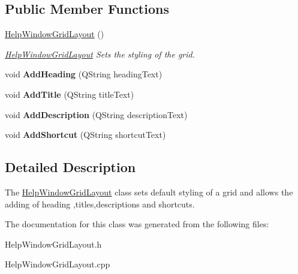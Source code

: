 \subsection*{Public Member Functions}
\begin{DoxyCompactItemize}
\item 
\hypertarget{class_help_window_grid_layout_abe267213e1b3e751df8ef27a715e7e19}{}\hyperlink{class_help_window_grid_layout_abe267213e1b3e751df8ef27a715e7e19}{Help\+Window\+Grid\+Layout} ()\label{class_help_window_grid_layout_abe267213e1b3e751df8ef27a715e7e19}

\begin{DoxyCompactList}\small\item\em \hyperlink{class_help_window_grid_layout}{Help\+Window\+Grid\+Layout} Sets the styling of the grid. \end{DoxyCompactList}\item 
\hypertarget{class_help_window_grid_layout_aa6a48127d7131741b3404249f4ecda31}{}void {\bfseries Add\+Heading} (Q\+String heading\+Text)\label{class_help_window_grid_layout_aa6a48127d7131741b3404249f4ecda31}

\item 
\hypertarget{class_help_window_grid_layout_a5c93617fe83a8fcaccad75a054575357}{}void {\bfseries Add\+Title} (Q\+String title\+Text)\label{class_help_window_grid_layout_a5c93617fe83a8fcaccad75a054575357}

\item 
\hypertarget{class_help_window_grid_layout_a803ac117f25c0741e66de27d4636b6c2}{}void {\bfseries Add\+Description} (Q\+String description\+Text)\label{class_help_window_grid_layout_a803ac117f25c0741e66de27d4636b6c2}

\item 
\hypertarget{class_help_window_grid_layout_a7f8ac7ea831a4e4e9954895b59db32ee}{}void {\bfseries Add\+Shortcut} (Q\+String shortcut\+Text)\label{class_help_window_grid_layout_a7f8ac7ea831a4e4e9954895b59db32ee}

\end{DoxyCompactItemize}


\subsection{Detailed Description}
The \hyperlink{class_help_window_grid_layout}{Help\+Window\+Grid\+Layout} class sets default styling of a grid and allows the adding of heading ,titles,descriptions and shortcuts. 

The documentation for this class was generated from the following files\+:\begin{DoxyCompactItemize}
\item 
Help\+Window\+Grid\+Layout.\+h\item 
Help\+Window\+Grid\+Layout.\+cpp\end{DoxyCompactItemize}
